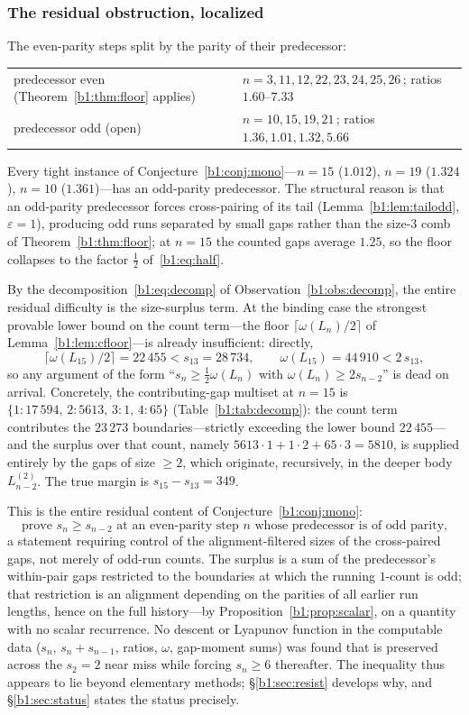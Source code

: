 \documentclass[a4paper]{article}
\theoremstyle{plain}
\theoremstyle{definition}
\theoremstyle{remark}
\begin{document}
\subsubsection{The residual obstruction, localized}\label{b1:sec:12.1}
The even-parity steps split by the parity of their predecessor:
\begin{center}
\begin{tabular}{ll}
predecessor even (Theorem~\ref{b1:thm:floor} applies) & $n=3,11,12,22,23,24,25,26$\,; ratios $1.60$--$7.33$\\
predecessor odd (open) & $n=10,15,19,21$\,; ratios $1.36,1.01,1.32,5.66$
\end{tabular}
\end{center}
Every tight instance of Conjecture~\ref{b1:conj:mono}---$n=15$ ($1.012$), $n=19$ ($1.324$), $n=10$ ($1.361$)---has an odd-parity predecessor. The structural reason is that an odd-parity predecessor forces cross-pairing of its tail (Lemma~\ref{b1:lem:tailodd}, $\varepsilon=1$), producing odd runs separated by small gaps rather than the size-$3$ comb of Theorem~\ref{b1:thm:floor}; at $n=15$ the counted gaps average $1.25$, so the floor collapses to the factor $\tfrac12$ of~\eqref{b1:eq:half}.

By the decomposition~\eqref{b1:eq:decomp} of Observation~\ref{b1:obs:decomp}, the entire residual difficulty is the size-surplus term. At the binding case the strongest provable lower bound on the count term---the floor $\lceil\omega(L_n)/2\rceil$ of Lemma~\ref{b1:lem:cfloor}---is already insufficient: directly,
\[ \lceil\omega(L_{15})/2\rceil=22\,455<s_{13}=28\,734,\qquad \omega(L_{15})=44\,910<2\,s_{13}, \]
so any argument of the form ``$s_n\ge\tfrac12\omega(L_n)$ with $\omega(L_n)\ge 2s_{n-2}$'' is dead on arrival. Concretely, the contributing-gap multiset at $n=15$ is $\{1:17\,594,\,2:5613,\,3:1,\,4:65\}$ (Table~\ref{b1:tab:decomp}): the count term contributes the $23\,273$ boundaries---strictly exceeding the lower bound $22\,455$---and the surplus over that count, namely $5613\cdot 1+1\cdot 2+65\cdot 3=5810$, is supplied entirely by the gaps of size $\ge 2$, which originate, recursively, in the deeper body $L^{(2)}_{n-2}$. The true margin is $s_{15}-s_{13}=349$.

This is the entire residual content of Conjecture~\ref{b1:conj:mono}:
\[ \text{prove }s_n\ge s_{n-2}\text{ at an even-parity step $n$ whose predecessor is of odd parity,} \]
a statement requiring control of the alignment-filtered sizes of the cross-paired gaps, not merely of odd-run counts. The surplus is a sum of the predecessor's within-pair gaps restricted to the boundaries at which the running $1$-count is odd; that restriction is an alignment depending on the parities of all earlier run lengths, hence on the full history---by Proposition~\ref{b1:prop:scalar}, on a quantity with no scalar recurrence. No descent or Lyapunov function in the computable data ($s_n$, $s_n+s_{n-1}$, ratios, $\omega$, gap-moment sums) was found that is preserved across the $s_2=2$ near miss while forcing $s_n\ge 6$ thereafter. The inequality thus appears to lie beyond elementary methods; \S\ref{b1:sec:resist} develops why, and \S\ref{b1:sec:status} states the status precisely.
\end{document}
